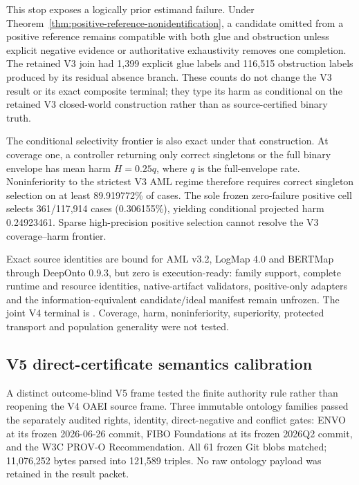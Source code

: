 This stop exposes a logically prior estimand failure. Under
Theorem~\ref{thm:positive-reference-nonidentification}, a candidate omitted
from a positive reference remains compatible with both glue and obstruction
unless explicit negative evidence or authoritative exhaustivity removes one
completion. The retained V3 join had 1,399 explicit glue labels and 116,515
obstruction labels produced by its residual absence branch. These counts do
not change the V3 result or its exact composite terminal; they type its harm as
conditional on the retained V3 closed-world construction rather than as
source-certified binary truth.

The conditional selectivity frontier is also exact under that construction.
At coverage one, a controller returning only correct singletons or the full
binary envelope has mean harm $H=0.25q$, where $q$ is the full-envelope rate.
Noninferiority to the strictest V3 AML regime therefore requires correct
singleton selection on at least 89.919772\% of cases. The sole frozen
zero-failure positive cell selects 361/117,914 cases (0.306155\%), yielding
conditional projected harm 0.24923461. Sparse high-precision positive
selection cannot resolve the V3 coverage--harm frontier.

Exact source identities are bound for AML v3.2, LogMap 4.0 and BERTMap through
DeepOnto 0.9.3, but zero is execution-ready: family support, complete runtime
and resource identities, native-artifact validators, positive-only adapters
and the information-equivalent candidate/ideal manifest remain unfrozen. The
joint V4 terminal is
.
Coverage, harm, noninferiority, superiority, protected transport and population
generality were not tested.

\subsection{V5 direct-certificate semantics calibration}

A distinct outcome-blind V5 frame tested the finite authority rule rather than
reopening the V4 OAEI source frame.  Three immutable ontology families passed
the separately audited rights, identity, direct-negative and conflict gates:
ENVO at its frozen 2026-06-26 commit, FIBO Foundations at its frozen 2026Q2
commit, and the W3C PROV-O Recommendation.  All 61 frozen Git blobs matched;
11,076,252 bytes parsed into 121,589 triples. No raw ontology payload was
retained in the result packet.

